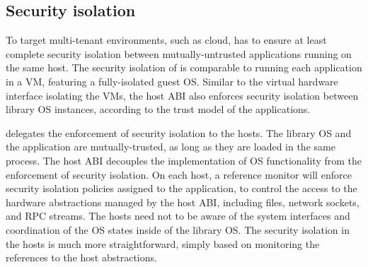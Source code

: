 







\subsection{Security isolation}
\label{sec:overview:host:security}


To target multi-tenant environments, such as cloud,
\graphene{} has to ensure at least complete security isolation between mutually-untrusted applications running on the same host.
The security isolation of \graphene{} is comparable to running each application
in a VM, featuring a fully-isolated guest OS.
Similar to the virtual hardware interface isolating the VMs,
the host ABI also enforces security isolation between library OS instances,
according to the trust model of the applications.



\graphene{} delegates the enforcement of security isolation to the hosts.
The library OS and the application are mutually-trusted, as long as they are loaded in the same process.
The host ABI decouples the implementation of OS functionality
from the enforcement of security isolation.
On each host, a reference monitor will enforce security isolation policies assigned to the application, to control the access to the hardware abstractions managed by the host ABI, including files, network sockets, and RPC streams.
The hosts need not to be aware of the system interfaces and coordination of the OS states
inside of the library OS.
The security isolation in the hosts
is much more straightforward, simply based on monitoring the references
to the host abstractions.





